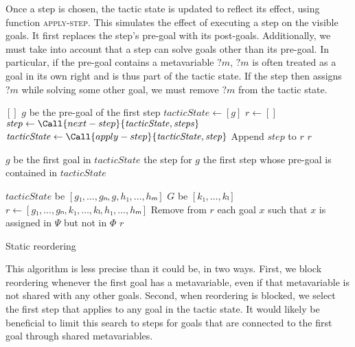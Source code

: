 \documentclass[sigplan,10pt,anonymous,review]{acmart}
\newcommand{\mvar}[1]{{?#1}}
\begin{document}
Once a step is chosen, the tactic state is updated to reflect its effect, using function \textsc{apply-step}.
This simulates the effect of executing a step on the visible goals.
It first replaces the step's pre-goal with its post-goals.
Additionally, we must take into account that a step can solve goals other than its pre-goal.
In particular, if the pre-goal contains a metavariable $\mvar{m}$, $\mvar{m}$ is often treated as a goal in its own right and is thus part of the tactic state.
If the step then assigns $\mvar{m}$ while solving some other goal, we must remove $\mvar{m}$ from the tactic state.

\begin{algorithm}
  \begin{algorithmic}
        \State \Return $[]$
      \EndIf
      \State \Let $g$ be the pre-goal of the first step
      \State $\mathit{tacticState} \gets [g]$
      \State $r \gets []$
        \State $\mathit{step} \gets \Call{next-step}{\mathit{tacticState}, \mathit{steps}}$
        \State $\mathit{tacticState} \gets \Call{apply-step}{\mathit{tacticState}, \mathit{step}}$
        \State Append $\mathit{step}$ to $r$
      \EndWhile
      \State \Return $r$
    \EndFunction

    \medskip

      \State \Let $g$ be the first goal in $\mathit{tacticState}$
        \State \Return the step for $g$
      \Else
        \State \Return the first step whose pre-goal is contained in $\mathit{tacticState}$
      \EndIf
    \EndFunction

    \medskip

      \State \Let $\mathit{tacticState}$ be $[g₁, \dots, gₙ, g, h₁, \dots, hₘ]$
      \State \Let $G$ be $[k₁, \dots, kₗ]$
      \State $r \gets [g₁, ..., gₙ, k₁, \dots, kₗ, h₁, \dots, hₘ]$
      \State Remove from $r$ each goal $x$ such that $x$ is assigned in $Ψ$ but not in $Φ$
      \State \Return $r$
    \EndFunction
  \end{algorithmic}
  \caption{Static reordering}\label{alg:static-reordering}
\end{algorithm}

This algorithm is less precise than it could be, in two ways.
First, we block reordering whenever the first goal has a metavariable, even if that metavariable is not shared with any other goals.
Second, when reordering is blocked, we select the first step that applies to any goal in the tactic state.
It would likely be beneficial to limit this search to steps for goals that are connected to the first goal through shared metavariables.
\end{document}
